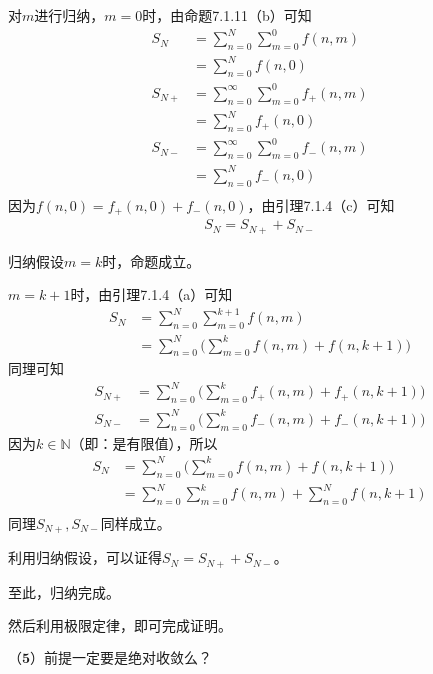 \documentclass{article}
\begin{document}
对$m$进行归纳，$m = 0$时，由命题7.1.11（b）可知
\begin{align*}
    S_N    & = \sum \limits_{n=0}^N \sum \limits_{m=0}^0 f(n,m)          \\
           & = \sum \limits_{n=0}^N f(n,0)                               \\
    S_{N+} & = \sum \limits_{n=0}^\infty \sum \limits_{m=0}^0 f_{+}(n,m) \\
           & = \sum \limits_{n=0}^N f_{+}(n,0)                           \\
    S_{N-} & = \sum \limits_{n=0}^\infty \sum \limits_{m=0}^0 f_{-}(n,m) \\
           & = \sum \limits_{n=0}^N f_{-}(n,0)                           \\
\end{align*}
因为$f(n,0) = f_{+}(n,0) + f_{-}(n,0)$，由引理7.1.4（c）可知
\begin{align*}
    S_N = S_{N+} + S_{N-}
\end{align*}

归纳假设$m=k$时，命题成立。

$m = k+1$时，由引理7.1.4（a）可知
\begin{align*}
    S_N & = \sum \limits_{n=0}^N \sum \limits_{m=0}^{k+1} f(n,m)                       \\
        & = \sum \limits_{n=0}^N \big (\sum \limits_{m=0}^{k} f(n,m) + f(n,k+1) \big )
\end{align*}
同理可知
\begin{align*}
    S_{N+} & = \sum \limits_{n=0}^N \big (\sum \limits_{m=0}^{k} f_{+}(n,m) + f_{+}(n,k+1) \big ) \\
    S_{N-} & = \sum \limits_{n=0}^N \big (\sum \limits_{m=0}^{k} f_{-}(n,m) + f_{-}(n,k+1) \big )
\end{align*}
因为$k \in \mathbb{N}$（即：是有限值），所以
\begin{align*}
    S_N & = \sum \limits_{n=0}^N \big (\sum \limits_{m=0}^{k} f(n,m) + f(n,k+1) \big )         \\
        & = \sum \limits_{n=0}^N \sum \limits_{m=0}^{k} f(n,m) + \sum \limits_{n=0}^N f(n,k+1) \\
\end{align*}
同理$S_{N+},S_{N-}$同样成立。

利用归纳假设，可以证得$S_N = S_{N+} + S_{N-}$。

至此，归纳完成。

然后利用极限定律，即可完成证明。

$\textbf{（5）前提一定要是绝对收敛么？} $
\end{document}
